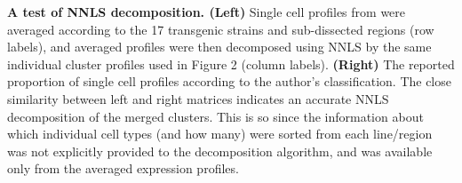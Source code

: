\textbf{A test of NNLS decomposition. (Left)} Single cell profiles from \cite{Tasic_2016} were averaged according to the 17 transgenic strains and sub-dissected regions (row labels), and averaged profiles were then decomposed using NNLS by the same individual cluster profiles used in Figure 2 (column labels). \textbf{(Right)} The reported proportion of single cell profiles according to the author's classification. The close similarity between left and right matrices indicates an accurate NNLS decomposition of the merged clusters. This is so since the information about which individual cell types (and how many) were sorted from each line/region was not explicitly provided to the decomposition algorithm, and was available only from the averaged expression profiles.